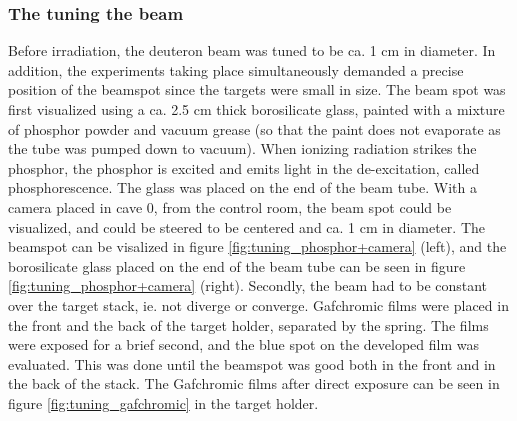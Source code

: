 \subsubsection{The tuning the beam}
Before irradiation, the deuteron beam was tuned to be ca. 1 cm in diameter. In addition, the experiments taking place simultaneously demanded a precise position of the beamspot since the targets were small in size. The beam spot was first visualized using a ca. 2.5 cm thick borosilicate glass, painted with a mixture of phosphor powder and vacuum grease (so that the paint does not evaporate as the tube was pumped down to vacuum). When ionizing radiation strikes the phosphor, the phosphor is excited and emits light in the de-excitation, called phosphorescence.  The glass was placed on the end of the beam tube. With a camera placed in cave 0, from the control room, the beam spot could be visualized, and could be steered to be centered and ca. 1 cm in diameter. The beamspot can be visalized in figure \ref{fig:tuning_phosphor+camera} (left), and the borosilicate glass placed on the end of the beam tube can be seen in figure \ref{fig:tuning_phosphor+camera} (right). Secondly, the beam had to be constant over the target stack, ie. not diverge or converge. Gafchromic films were placed in the front and the back of the target holder, separated by the spring. The films were exposed for a brief second, and the blue spot on the developed film was evaluated. This was done until the beamspot was good both in the front and in the back of the stack. The Gafchromic films after direct exposure can be seen in figure \ref{fig:tuning_gafchromic} in the target holder.  \\

